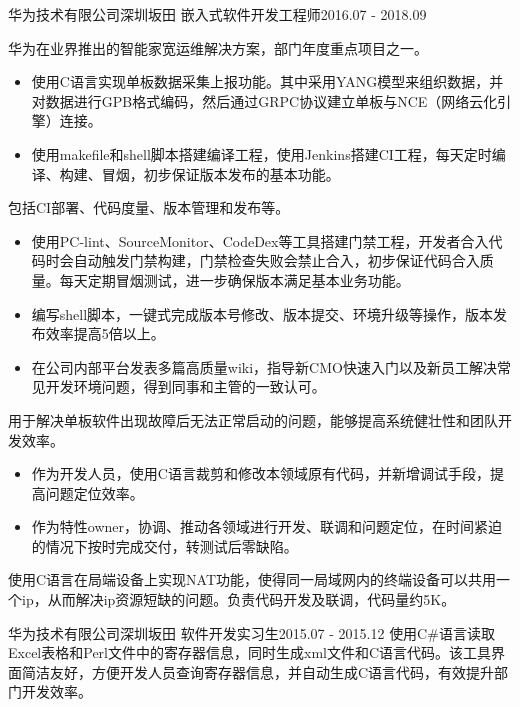     \resumeSubheading
      {华为技术有限公司}{深圳坂田}
      {嵌入式软件开发工程师}{2016.07 - 2018.09}
      \resumeItemListStart
          {华为在业界推出的智能家宽运维解决方案，部门年度重点项目之一。
            \begin{itemize}
                \item 使用C语言实现单板数据采集上报功能。其中采用YANG模型来组织数据，并对数据进行GPB格式编码，然后通过GRPC协议建立单板与NCE（网络云化引擎）连接。
                \item 使用makefile和shell脚本搭建编译工程，使用Jenkins搭建CI工程，每天定时编译、构建、冒烟，初步保证版本发布的基本功能。
            \end{itemize}
          }
          {包括CI部署、代码度量、版本管理和发布等。
            \begin{itemize}
                \item 使用PC-lint、SourceMonitor、CodeDex等工具搭建门禁工程，开发者合入代码时会自动触发门禁构建，门禁检查失败会禁止合入，初步保证代码合入质量。每天定期冒烟测试，进一步确保版本满足基本业务功能。
                \item 编写shell脚本，一键式完成版本号修改、版本提交、环境升级等操作，版本发布效率提高5倍以上。
                \item 在公司内部平台发表多篇高质量wiki，指导新CMO快速入门以及新员工解决常见开发环境问题，得到同事和主管的一致认可。
            \end{itemize}
          }
          { 用于解决单板软件出现故障后无法正常启动的问题，能够提高系统健壮性和团队开发效率。
            \begin{itemize}
                \item 作为开发人员，使用C语言裁剪和修改本领域原有代码，并新增调试手段，提高问题定位效率。
                \item 作为特性owner，协调、推动各领域进行开发、联调和问题定位，在时间紧迫的情况下按时完成交付，转测试后零缺陷。
            \end{itemize}
          }
          {使用C语言在局端设备上实现NAT功能，使得同一局域网内的终端设备可以共用一个ip，从而解决ip资源短缺的问题。负责代码开发及联调，代码量约5K。}
      \resumeItemListEnd

    \resumeSubheading
      {华为技术有限公司}{深圳坂田}
      {软件开发实习生}{2015.07 - 2015.12}
      \resumeItemListStart
          {使用C\#语言读取Excel表格和Perl文件中的寄存器信息，同时生成xml文件和C语言代码。该工具界面简洁友好，方便开发人员查询寄存器信息，并自动生成C语言代码，有效提升部门开发效率。}
      \resumeItemListEnd

